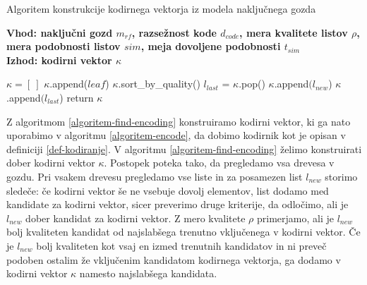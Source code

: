 \documentclass[12pt,a4paper,twoside]{article}
\theoremstyle{definition} %
\theoremstyle{plain} %
\numberwithin{equation}{section}  %
\begin{document}
\begin{algorithm}[h!]
  \caption{Algoritem konstrukcije kodirnega vektorja iz modela naključnega gozda}
  \label{algoritem-find-encoding}
  \raggedright
  \textbf{Vhod: naključni gozd $m_{rf}$, razsežnost kode $d_{code}$, mera kvalitete listov $\rho$, mera podobnosti listov $sim$, meja dovoljene podobnosti $t_{sim}$}  \\
  \textbf{Izhod: kodirni vektor $\kappa$} %
  \begin{algorithmic}[0]
	\State $\kappa = [\ ]$
				\State $\kappa$.append($leaf$)
			\EndIf
		\EndFor
	\EndFor
				\State $\kappa$.sort\_by\_quality()
				\State $l_{last}$ = $\kappa$.pop()
						\State $\kappa$.append$(l_{new}$)
					\Else
						\State $\kappa$.append$(l_{last}$)
					\EndIf
				\EndIf
			\EndIf
		\EndFor
	\EndFor	
	\State return $\kappa$
  \end{algorithmic}
\end{algorithm}

Z algoritmom \ref{algoritem-find-encoding} konstruiramo kodirni vektor, ki ga nato uporabimo v algoritmu \ref{algoritem-encode}, 
da dobimo kodirnik kot je opisan v definiciji \ref{def-kodiranje}.
V algoritmu \ref{algoritem-find-encoding} želimo konstruirati dober kodirni vektor $\kappa$. Postopek poteka tako, da pregledamo vsa drevesa v gozdu. 
Pri vsakem drevesu pregledamo vse liste in za posamezen list $l_{new}$ storimo sledeče: 
če kodirni vektor še ne vsebuje dovolj elementov, list dodamo med kandidate za kodirni vektor, sicer preverimo druge kriterije, da odločimo, ali je $l_{new}$ dober kandidat za kodirni vektor. 
Z mero kvalitete $\rho$ primerjamo, ali je $l_{new}$ bolj kvaliteten kandidat od najslabšega trenutno vključenega v kodirni vektor. 
Če je $l_{new}$ bolj kvaliteten kot vsaj en izmed trenutnih kandidatov in ni preveč podoben ostalim že vključenim kandidatom kodirnega vektorja, ga dodamo v kodirni vektor $\kappa$ namesto najslabšega kandidata.
\end{document}
